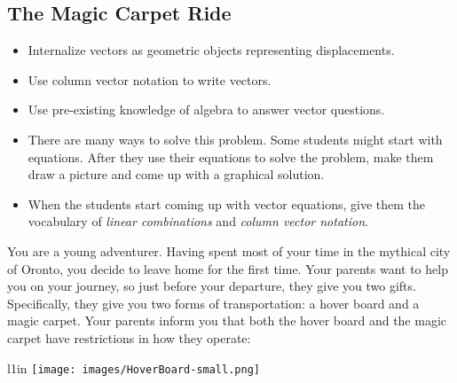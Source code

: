 \begin{iola}
\section*{The Magic Carpet Ride}

\question
\begin{annotation}
	\begin{goals}
		\begin{itemize}
			\item Internalize vectors as geometric objects representing
				displacements.

			\item Use column vector notation to write vectors.

			\item Use pre-existing knowledge of algebra to answer vector
				questions.
		\end{itemize}
	\end{goals}
	\begin{notes}

		\begin{itemize}
			\item There are many ways to solve this problem.
				Some students
				might start with equations. After they use their
				equations to solve the problem, make them draw a picture
				and come up with a graphical solution.

			\item When the students start coming up with vector equations,
				give them the vocabulary of \emph{linear
				combinations}
				and \emph{column vector notation}.
		\end{itemize}
	\end{notes}
\end{annotation}
You are a young adventurer. Having spent most of your time in the mythical city of Oronto,
	you decide to leave home for the first time. Your parents
want to help you on your journey, so just before your departure, they give you two
gifts. Specifically, they give you two forms of transportation: a hover board and
a magic carpet. Your parents inform you that both the hover board and the magic carpet
have restrictions in how they operate:

\begin{minipage}{\textwidth}
	\vspace{.5cm}
	\begin{wrapfigure}{l}{1in}
	\vspace{-.8cm}
	\texttt{[image: images/HoverBoard-small.png]}
	\end{wrapfigure}


\end{minipage}
\end{iola}
